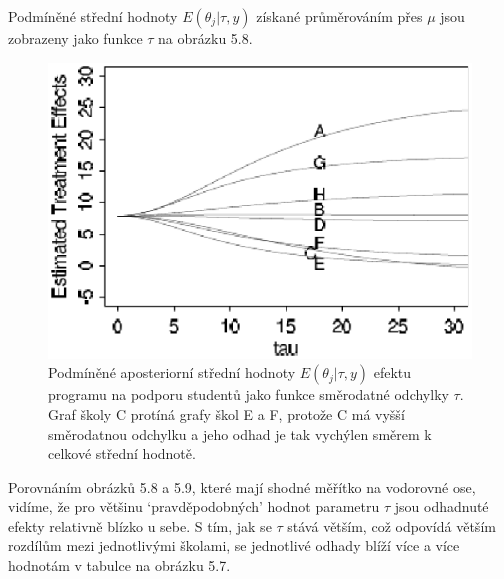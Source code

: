 Podmíněné střední hodnoty $E(\theta_j|\tau, y)$ získané průměrováním přes $\mu$ jsou zobrazeny jako funkce $\tau$ na obrázku 5.8.
\begin{figure}[htp]
\centering
\includegraphics[scale = 0.45]{pictures/fig_5_6.eps}
\caption{Podmíněné aposteriorní střední hodnoty $E(\theta_j | \tau, y)$ efektu programu na podporu studentů jako funkce směrodatné odchylky $\tau$. Graf školy C protíná grafy škol E a F, protože C má vyšší směrodatnou odchylku a jeho odhad je tak vychýlen směrem k celkové střední hodnotě.}
\label{fig_5_6}
\end{figure}
Porovnáním obrázků 5.8 a 5.9, které mají shodné měřítko na vodorovné ose, vidíme, že pro většinu `pravděpodobných' hodnot  parametru $\tau$ jsou odhadnuté efekty relativně blízko u sebe. S tím, jak se $\tau$ stává větším, což odpovídá větším rozdílům mezi jednotlivými školami, se jednotlivé odhady blíží více a více hodnotám v tabulce na obrázku 5.7.

